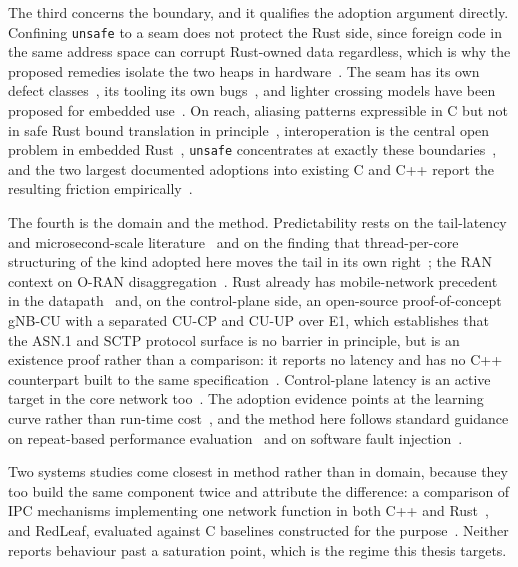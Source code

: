 \documentclass[english,twoside,openright,a4paper,censored,csm,software-track-2020]{HYthesisML}
\begin{document}
The third concerns the boundary, and it qualifies the adoption argument directly. Confining
\texttt{unsafe} to a seam does not protect the Rust side, since foreign code in the same address
space can corrupt Rust-owned data regardless, which is why the proposed remedies isolate the two
heaps in hardware~\cite{rivera2021galeed,kirth2022pkrusafe}. The seam has its own defect
classes~\cite{li2022crosslang}, its tooling its own bugs~\cite{cai2026interop}, and lighter
crossing models have been proposed for embedded use~\cite{schuermann2023encapsulated}. On reach,
aliasing patterns expressible in C but not in safe Rust bound translation in
principle~\cite{emre2023aliasing}, interoperation is the central open problem in embedded
Rust~\cite{sharma2024embedded}, \texttt{unsafe} concentrates at exactly these
boundaries~\cite{mccormack2026unsafe}, and the two largest documented adoptions into existing C
and C++ report the resulting friction
empirically~\cite{li2024rustforlinux,fan2026android}.

The fourth is the domain and the method. Predictability rests on the tail-latency and
microsecond-scale
literature~\cite{dean2013tail,barroso2017microseconds,li2014tales,huang2017predictability} and on
the finding that thread-per-core structuring of the kind adopted here moves the tail in its own
right~\cite{enberg2019threadpercore}; the RAN context on O-RAN
disaggregation~\cite{polese2023oran}. Rust already has mobile-network precedent in the
datapath~\cite{qazi2017pepc} and, on the control-plane side, an open-source proof-of-concept
gNB-CU with a separated CU-CP and CU-UP over E1, which establishes that the ASN.1 and SCTP
protocol surface is no barrier in principle, but is an existence proof rather than a comparison:
it reports no latency and has no C++ counterpart built to the same
specification~\cite{alsoran}. Control-plane latency is an active target in the core network
too~\cite{liu2023l25gc,park2025ctrlbench}. The adoption evidence points at the learning curve
rather than run-time cost~\cite{fulton2021adopting,crichton2024learning,ardito2021verbosity}, and
the method here follows standard guidance on repeat-based performance
evaluation~\cite{georges2007rigorous} and on software fault
injection~\cite{natella2016fault}.

Two systems studies come closest in method rather than in domain, because they too build the same
component twice and attribute the difference: a comparison of IPC mechanisms implementing one
network function in both C++ and Rust~\cite{li2021ipc}, and RedLeaf, evaluated against C
baselines constructed for the purpose~\cite{narayanan2020redleaf}. Neither reports behaviour past
a saturation point, which is the regime this thesis targets.
\end{document}
